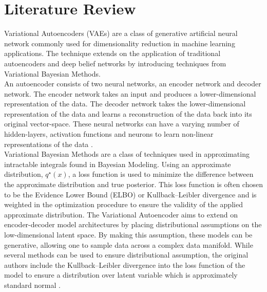 \documentclass[12pt]{extarticle}
\begin{document}
\newpage
\section*{Literature Review}
Variational Autoencoders (VAEs) are a class of generative artificial neural network commonly used for dimensionality reduction in machine learning applications.  The technique extends on the application of traditional autoencoders and deep belief networks by introducing techniques from Variational Bayesian Methods.  \\
\newline
An autoencoder consists of two neural networks, an encoder network and decoder network. The encoder network takes an input and produces a lower-dimensional representation of the data. The decoder network takes the lower-dimensional representation of the data and learns a reconstruction of the data back into its original vector-space. These neural networks can have a varying number of hidden-layers, activation functions and neurons to learn non-linear representations of the data \citep{Bengio2007, Bengio2013}.\\ \newline
Variational Bayesian Methods are a class of techniques used in approximating intractable integrals found in Bayesian Modeling.  Using an approximate distribution, $q^\star(x)$, a loss function is used to minimize the difference between the approximate distribution and true posterior.  This loss function is often chosen to be the Evidence Lower Bound (ELBO) or Kullback–Leibler divergence and is weighted in the optimization procedure to ensure the validity of the applied approximate distribution.   
\newline
The Variational Autoencoder aims to extend on encoder-decoder model architectures by placing distributional assumptions on the low-dimensional latent space.  By making this assumption, these models can be generative, allowing one to sample data across a complex data manifold.  While several methods can be used to ensure distributional assumption, the original authors include the Kullback–Leibler divergence into the loss function of the model to ensure a distribution over latent variable which is approximately standard normal \citep{vaeBayes, zhao2017infovae, tolstikhin2017wasserstein}.  
\\
\end{document}
